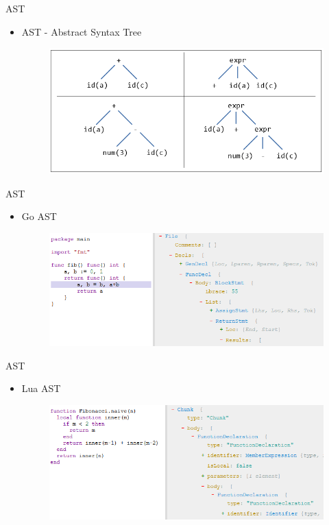 \documentclass{beamer}
\begin{document}
\begin{frame}{AST}
    \begin{itemize}
        \item AST - Abstract Syntax Tree
        \begin{figure}[h!]
            \centering
            \includegraphics[scale=0.55]{images/ast.PNG}
        \end{figure}
    \end{itemize}
\end{frame}

\begin{frame}{AST}
    \begin{itemize}
        \item Go AST
        \begin{figure}[h!]
            \centering
            \includegraphics[scale=0.6]{images/ast_go.PNG}
        \end{figure}
    \end{itemize}
\end{frame}

\begin{frame}{AST}
    \begin{itemize}
        \item Lua AST
        \begin{figure}[h!]
            \centering
            \includegraphics[scale=0.6]{images/ast_lua.PNG}
        \end{figure}
    \end{itemize}
\end{frame}
\end{document}
